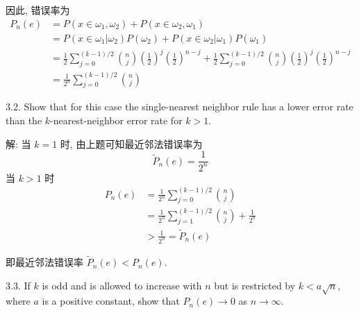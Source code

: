 \documentclass[openany]{ctexbook}
\theoremstyle{kaiti}
\theoremstyle{normal}
\begin{document}
因此, 错误率为
\begin{equation}
  \begin{aligned}
    P_n(e)
    &=P(x\in\omega_1,\omega_2)+P(x\in\omega_2,\omega_1)\\
    &=P(x\in\omega_1|\omega_2)P(\omega_2)+P(x\in\omega_2|\omega_1)P(\omega_1)\\
    &=\frac{1}{2}\sum_{j=0}^{(k-1)/2}\binom{n}{j}\left(\frac{1}{2}\right)^j\left(\frac{1}{2}\right)^{n-j}+\frac{1}{2}\sum_{j=0}^{(k-1)/2}\binom{n}{j}\left(\frac{1}{2}\right)^j\left(\frac{1}{2}\right)^{n-j}\\
    &=\frac{1}{2^n}\sum_{j=0}^{(k-1)/2}\binom{n}{j}
  \end{aligned}
\end{equation}

3.2. Show that for this case the single-nearest neighbor rule has a lower error rate than the $k$-nearest-neighbor error rate for $k>1$.

解: 当 $k=1$ 时, 由上题可知最近邻法错误率为
\begin{equation}
  \tilde{P}_n(e)=\frac{1}{2^n}
\end{equation}
当 $k>1$ 时
\begin{equation}
  \begin{aligned}
    P_n(e)
    &=\frac{1}{2^n}\sum_{j=0}^{(k-1)/2}\binom{n}{j}\\
    &=\frac{1}{2^n}\sum_{j=1}^{(k-1)/2}\binom{n}{j}+\frac{1}{2^n}\\
    &>\frac{1}{2^n}=\tilde{P}_n(e)
  \end{aligned}
\end{equation}

即最近邻法错误率 $\tilde{P}_n(e)<P_n(e)$.

3.3. If $k$ is odd and is allowed to increase with $n$ but is restricted by $k < a\sqrt{n}$, where $a$ is a positive constant, show that $P_n(e) \to 0$ as $n \to \infty$.
\end{document}
